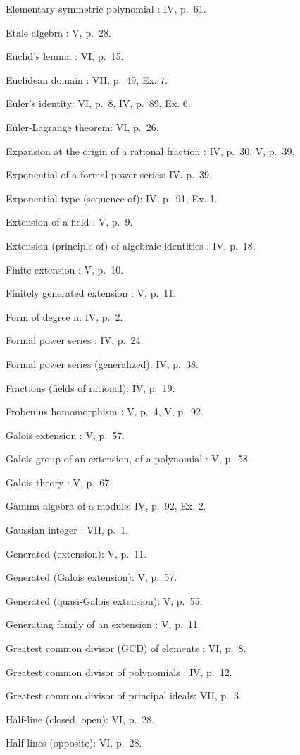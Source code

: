 Elementary symmetric polynomial : IV, p.~61.

Etale algebra : V, p.~28.

Euclid's lemma : VI, p.~15.

Euclidean domain : VII, p.~49, Ex. 7.

Euler's identity: VI, p.~8, IV, p.~89, Ex. 6.

Euler-Lagrange theorem: VI, p.~26.

Expansion at the origin of a rational fraction : IV, p.~30, V, p.~39.

Exponential of a formal power series: IV, p.~39.

Exponential type (sequence of): IV, p.~91, Ex. 1.

Extension of a field : V, p.~9.

Extension (principle of) of algebraic identities : IV, p.~18.

Finite extension : V, p.~10.

Finitely generated extension : V, p.~11.

Form of degree n: IV, p.~2.

Formal power series : IV, p.~24.

Formal power series (generalized): IV, p.~38.

Fractions (fields of rational): IV, p.~19.

Frobenius homomorphism : V, p.~4, V, p.~92.

Galois extension : V, p.~57.

Galois group of an extension, of a polynomial : V, p.~58.

Galois theory : V, p.~67.

Gamma algebra of a module: IV, p.~92, Ex. 2.

Gaussian integer : VII, p.~1.

Generated (extension): V, p.~11.

Generated (Galois extension): V, p.~57.

Generated (quasi-Galois extension): V, p.~55.

Generating family of an extension : V, p.~11.

Greatest common divisor (GCD) of elements : VI, p.~8.

Greatest common divisor of polynomials : IV, p.~12.

Greatest common divisor of principal ideals: VII, p.~3.

Half-line (closed, open): VI, p.~28.

Half-lines (opposite): VI, p.~28.

